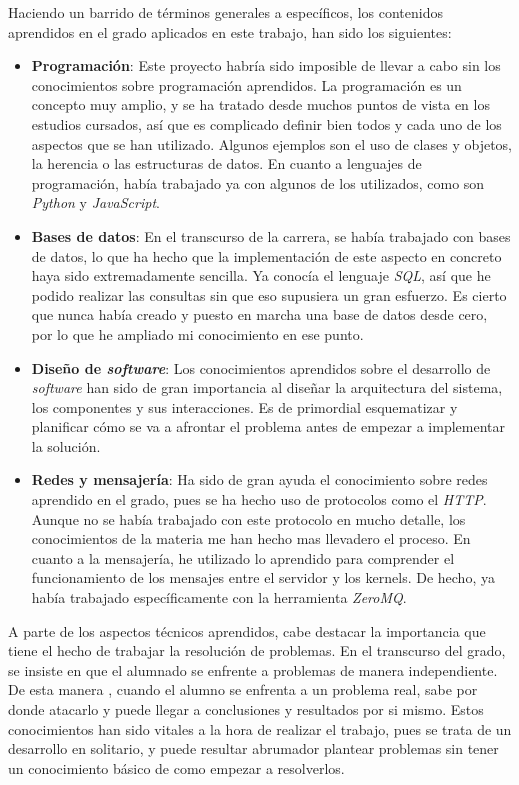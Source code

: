 \documentclass[11pt,spanish,listoffigures,listoftables]{tfgetsinf}
\begin{document}
Haciendo un barrido de términos generales a específicos, los contenidos aprendidos en el grado aplicados en este trabajo, han sido los siguientes: 

\begin{itemize}

\item \textbf{Programación}: Este proyecto habría sido imposible de llevar a cabo sin los conocimientos sobre programación aprendidos. La programación es un concepto muy amplio, y se ha tratado desde muchos puntos de vista en los estudios cursados, así que es complicado definir bien todos y cada uno de los aspectos que se han utilizado. Algunos ejemplos son el uso de clases y objetos, la herencia o las estructuras de datos. En cuanto a lenguajes de programación, había trabajado ya con algunos de los utilizados, como son \textit{Python} y \textit{JavaScript}.

\item \textbf{Bases de datos}: En el transcurso de la carrera, se había trabajado con bases de datos, lo que ha hecho que la implementación de este aspecto en concreto haya sido extremadamente sencilla. Ya conocía el lenguaje \textit{SQL}, así que he podido realizar las consultas sin que eso supusiera un gran esfuerzo. Es cierto que nunca había creado y puesto en marcha una base de datos desde cero, por lo que he ampliado mi conocimiento en ese punto.

\item \textbf{Diseño de \textit{software}}: Los conocimientos aprendidos sobre el desarrollo de \textit{software} han sido de gran importancia al diseñar la arquitectura del sistema, los componentes y sus interacciones. Es de primordial esquematizar y planificar cómo se va a afrontar el problema antes de empezar a implementar la solución.

\item \textbf{Redes y mensajería}: Ha sido de gran ayuda el conocimiento sobre redes aprendido en el grado, pues se ha hecho uso de protocolos como el \textit{HTTP}. Aunque no se había trabajado con este protocolo en mucho detalle, los conocimientos de la materia me han hecho mas llevadero el proceso. En cuanto a la mensajería, he utilizado lo aprendido para comprender el funcionamiento de los mensajes entre el servidor y los kernels. De hecho, ya había trabajado específicamente con la herramienta \textit{ZeroMQ}.

\end{itemize}

A parte de los aspectos técnicos aprendidos, cabe destacar la importancia que tiene el hecho de trabajar la resolución de problemas. En el transcurso del grado, se insiste en que el alumnado se enfrente a problemas de manera independiente. De esta manera , cuando el alumno se enfrenta a un problema real, sabe por donde atacarlo y puede llegar a conclusiones y resultados por si mismo. Estos conocimientos han sido vitales a la hora de realizar el trabajo, pues se trata de un desarrollo en solitario, y puede resultar abrumador plantear problemas sin tener un conocimiento básico de como empezar a resolverlos.
\end{document}
